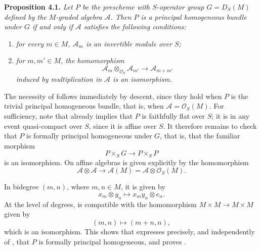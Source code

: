 \medskip
\noindent{}\textbf{Proposition 4.1.}
\textit{Let \(P\) be the prescheme with \(S\)-operator group
\(G=D_S(M)\) defined by the \(M\)-graded algebra \(\mathscr A\). Then
\(P\) is a principal homogeneous bundle under \(G\) if and only if
\(\mathscr A\) satisfies the following conditions:}
\begin{enumerate}
  \item[(a)]
  \textit{for every \(m\in M\), \(\mathscr A_m\) is an invertible module
  over \(S\);}

  \item[(b)]
  \textit{for \(m,m'\in M\), the homomorphism}
  \[
    \mathscr A_m\otimes_{\mathcal O_S}\mathscr A_{m'}
    \longrightarrow\mathscr A_{m+m'}
  \]
  \textit{induced by multiplication in \(\mathscr A\) is an
  isomorphism.}
\end{enumerate}

The necessity of  follows immediately by descent, since
they hold when \(P\) is the trivial principal homogeneous bundle, that
is, when \(\mathscr A=\mathcal O_S(M)\). For sufficiency, note that
 already implies
that \(P\) is faithfully flat over \(S\); it is in any event
quasi-compact over \(S\), since it is affine over \(S\). It therefore
remains to check that \(P\) is formally principal homogeneous under
\(G\), that is, that the familiar morphism
\[
  P\times_SG\longrightarrow P\times_SP
\]
is an isomorphism. On affine algebras  is given explicitly
by the homomorphism
\[
  \mathscr A\otimes\mathscr A
  \longrightarrow
  \mathscr A(M)=\mathscr A\otimes\mathcal O_S(M).
\]

In bidegree \((m,n)\), where \(m,n\in M\), it is given by
\[
  x_m\otimes y_n\longmapsto x_my_n\otimes e_n.
\]
At the level of degrees,  is compatible with the
homomorphism \(M\times M\to M\times M\) given by
\[
  (m,n)\longmapsto(m+n,n),
\]
which is an isomorphism. This shows that
 expresses precisely,
and independently of ,
that \(P\) is formally principal homogeneous, and proves
.

